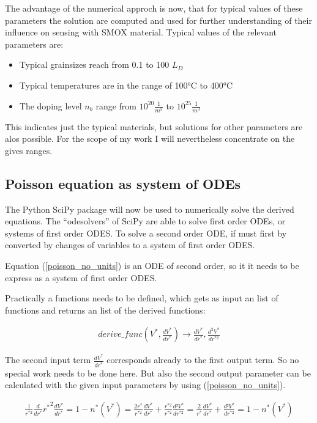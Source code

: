 \documentclass[11pt]{article}
\providecommand{\tightlist}{%
      \setlength{\itemsep}{0pt}\setlength{\parskip}{0pt}}
\begin{document}
The advantage of the numerical approch is now, that for typical values
of these parameters the solution are computed and used for further
understanding of their influence on sensing with SMOX material. Typical
values of the relevant parameters are:

\begin{itemize}
\tightlist
\item
  Typical grainsizes reach from 0.1 to 100 \(L_D\)
\item
  Typical temperatures are in the range of 100°C to 400°C
\item
  The doping level \(n_b\) range from \(10^{20}\frac{1}{m^3}\) to
  \(10^{25}\frac{1}{m^3}\)
\end{itemize}

This indicates just the typical materials, but solutions for other
parameters are alos possible. For the scope of my work I will
nevertheless concentrate on the gives ranges.

\hypertarget{poisson-equation-as-system-of-odes}{%
\subsection{Poisson equation as system of
ODEs}\label{poisson-equation-as-system-of-odes}}

The Python SciPy package \cite{Jones} will now be used to numerically
solve the derived equations. The ``odesolvers'' of SciPy are able to
solve first order ODEs, or systems of first order ODES. To solve a
second order ODE, if must first by converted by changes of variables to
a system of first order ODES.

Equation (\ref{poisson_no_units}) is an ODE of second order, so it it
needs to be express as a system of first order ODES.

Practically a functions needs to be defined, which gets as input an list
of functions and returns an list of the derived functions:

\begin{align}
derive\_func\left(V^{*},\frac{dV^{*}}{dr^{*}}\right)\longrightarrow\frac{dV^{*}}{dr^{*}},\frac{d^2V^{*}}{dr^{*2}}
\end{align}

The second input term \(\frac{dV^{*}}{dr^{*}}\) corresponds already to
the first output term. So no special work needs to be done here. But
also the second output parameter can be calculated with the given input
parameters by using (\ref{poisson_no_units}).

\begin{align}
\frac{1}{r^{*2}}\frac{d}{dr^{*}}{r^{*}}^{2}\frac{dV^{*}}{dr^{*}}=1-n^{*}(V^{*})=\frac{2r^{*}}{r^{*2}}\frac{dV^{*}}{dr^{*}}+\frac{r^{*2}}{r^{*2}}\frac{d²V^{*}}{dr^{*2}}=\frac{2}{r^{*}}\frac{dV^{*}}{dr^{*}}+\frac{d²V^{*}}{dr^{*2}}=1-n^{*}(V^{*}) 
\end{align}
\end{document}

